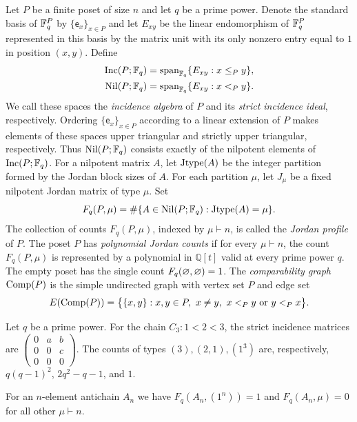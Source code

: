 \begin{definition}
\label{def:nil-profile}
Let $P$ be a finite poset of size $n$ and let $q$ be a prime power. { Denote  the standard basis of 
$\mathbb F_q^P$ by  $\{\mathsf e_x\}_{x\in P}$ and  let $E_{xy}$ be the linear endomorphism of $\mathbb F_q^P$ represented  in this basis by the matrix unit
with its only nonzero entry equal to $1$ in position $(x,y)$.} Define
\begin{align}
 \operatorname{Inc}(P;\mathbb F_q)&=\operatorname{span}_{\mathbb F_q}\{E_{xy}:x\leq_Py\},
 \label{eq:incidence-algebra}\\
 \operatorname{Nil}(P;\mathbb F_q)&=\operatorname{span}_{\mathbb F_q}\{E_{xy}:x<_Py\}.
 \label{eq:nil-space}
\end{align}
{We call these spaces the \emph{incidence algebra} of $P$
and its \emph{strict incidence ideal}, respectively. Ordering
$\{\mathsf e_x\}_{x\in P}$ according to a linear extension of $P$
makes elements of these spaces upper triangular and strictly upper
triangular, respectively.} Thus
$\operatorname{Nil}(P;\mathbb F_q)$ consists exactly of the nilpotent elements of $\operatorname{Inc}(P;\mathbb F_q)$.
For a nilpotent matrix $A$, let $\operatorname{Jtype}(A)$ be {the integer
partition formed by the Jordan block sizes of $A$}.
For each partition $\mu$, let $J_\mu$ be a fixed nilpotent Jordan matrix of type $\mu$.
Set
\begin{equation}
 F_q(P,\mu)=\#\{A\in\operatorname{Nil}(P;\mathbb F_q):\operatorname{Jtype}(A)=\mu\}.
 \label{eq:F-definition}
\end{equation}
{{The collection of counts $F_q(P,\mu)$,
indexed by $\mu\vdash n$, is called the \emph{Jordan profile} of $P$.} {The poset $P$ has
\emph{polynomial Jordan counts}} if for every $\mu\vdash n$, the  count $F_q(P,\mu)$ is represented by a polynomial in $\mathbb Q[t]$
valid at every prime power $q$.} The empty poset has the single count
$F_q(\varnothing,\varnothing)=1$.
{The \emph{comparability graph} $\operatorname{Comp}(P)$ is the
simple undirected graph with vertex set $P$ and edge set
\[
 E(\operatorname{Comp}(P))=\bigl\{\{x,y\}:x,y\in P,\ x\ne y,\
 x<_P y\text{ or }y<_P x\bigr\}.
\]
}
\end{definition}
\begin{example}
\label{ex:chain-profile}
Let $q$ be a prime power. For the chain $C_3:1<2<3$, the strict incidence
matrices are $\left(\begin{smallmatrix}0&a&b\\0&0&c\\0&0&0\end{smallmatrix}\right)$.
The counts of types $(3),(2,1),(1^3)$ are, respectively,
$q(q-1)^2$, $2q^2-q-1$, and $1$. {
	For an $n$-element antichain $A_n$ we have  $F_q(A_n,(1^n))=1$ and $F_q(A_n,\mu)=0$ for all other  $\mu\vdash n$.
	
}
\end{example}

